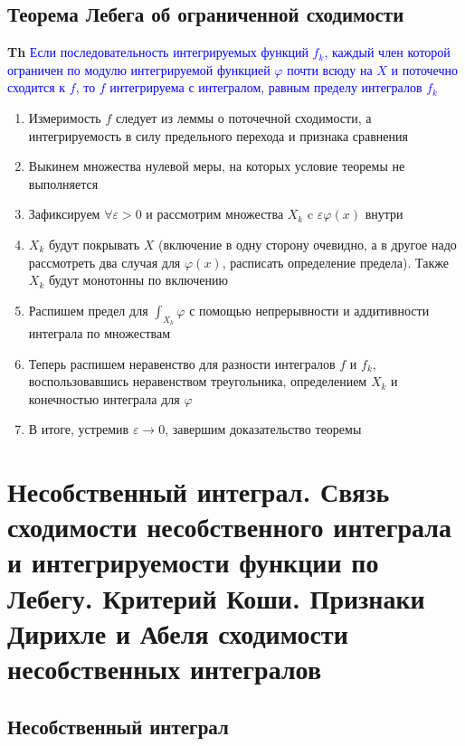 \documentclass[a4paper, 14pt]{article}
\begin{document}
    \subsection{Теорема Лебега об ограниченной сходимости}
    
    \textbf{Th} \textcolor{blue}{Если последовательность интегрируемых функций $f_k$, каждый член которой ограничен по
    модулю интегрируемой функцией $\varphi$ почти всюду на $X$ и поточечно сходится к $f$, то $f$ интегрируема с
    интегралом, равным пределу интегралов $f_k$}
    
    \begin{enumerate}
        \item Измеримость $f$ следует из леммы о поточечной сходимости, а интегрируемость в силу предельного перехода и
        признака сравнения
        \item Выкинем множества нулевой меры, на которых условие теоремы не выполняется
        \item Зафиксируем $\forall \varepsilon > 0$ и рассмотрим множества $X_k$ c $\varepsilon \varphi(x)$ внутри
        \item $X_k$ будут покрывать $X$ (включение в одну сторону очевидно, а в другое надо рассмотреть два случая
        для $\varphi(x)$, расписать определение предела).
        Также $X_k$ будут монотонны по включению
        \item Распишем предел для $\int_{X_k} \varphi$ с помощью непрерывности и аддитивности интеграла по множествам
        \item Теперь распишем неравенство для разности интегралов $f$ и $f_k$, воспользовавшись неравенством
        треугольника, определением $X_k$ и конечностью интеграла для $\varphi$
        \item В итоге, устремив $\varepsilon \rightarrow 0$, завершим доказательство теоремы
    \end{enumerate}
    
    \section{Несобственный интеграл.
    Связь сходимости несобственного интеграла и интегрируемости функции по Лебегу.
    Критерий Коши.
    Признаки Дирихле и Абеля сходимости несобственных интегралов}
    
    \subsection{Несобственный интеграл}
    
\end{document}
